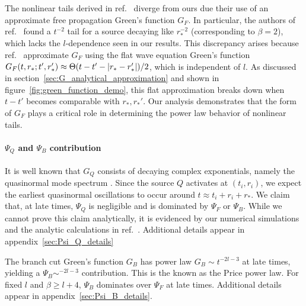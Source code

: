 \documentclass[reprint,aps,physrev,superscriptaddress,10pt,notitlepage,prd,nofootinbib,onecolumn]{revtex4-2}
\newcommand{\fref}[1]{figure~\ref{#1}}
\newcommand{\sref}[1]{section~\ref{#1}}
\newcommand{\aref}[1]{appendix~\ref{#1}}
\begin{document}
The nonlinear tails derived in ref.~\cite{Okuzumi:2008ej,Lagos:2022otp} diverge from ours due their use of an approximate free propagation Green's function $G_F$.
In particular, the authors of ref.~\cite{Okuzumi:2008ej,Lagos:2022otp} found a $t^{-2}$ tail for a source decaying like $r_*^{-2}$ (corresponding to $\beta = 2$), which lacks the $l$-dependence seen in our results.
This discrepancy arises because ref.~\cite{Okuzumi:2008ej,Lagos:2022otp} approximate $G_F$ using the flat wave equation Green's function $G_F(t,r_*;t',r_*') \approx \Theta(t - t' - \abs{r_*-r_*'}) / 2$, which is independent of $l$.
As discussed in \sref{sec:G_analytical_approximation} and shown in \fref{fig:green_function_demo}, this flat approximation breaks down when $t-t'$ becomes comparable with $r_*, r_*'$.
Our analysis demonstrates that the form of $G_F$ plays a critical role in determining the power law behavior of nonlinear tails.



\paragraph{$\Psi_Q$ and $\Psi_B$ contribution}
It is well known that $G_Q$ consists of decaying complex exponentials, namely the quasinormal mode spectrum \cite{Leaver:1986gd}.
Since the source $Q$ activates at $(t_i,r_i)$, we expect the earliest quasinormal oscillations to occur around $t \approx t_i + r_i + r_*$.
We claim that, at late times, $\Psi_Q$ is negligible and is dominated by $\Psi_F$ or $\Psi_B$.
While we cannot prove this claim analytically, it is evidenced by our numerical simulations and the analytic calculations in ref.~\cite{Barack:1998bw}.
Additional details appear in \aref{sec:Psi_Q_details}

The branch cut Green's function $G_B$ has power law $G_B \sim t^{-2l-3}$ at late times, yielding a $\Psi_B \sim ^{-2l-3}$ contribution.
This is the known as the Price power law.
For fixed $l$ and $\beta \geq l+4$, $\Psi_B$ dominates over $\Psi_F$ at late times.
Additional details appear in \aref{sec:Psi_B_details}.
\end{document}
